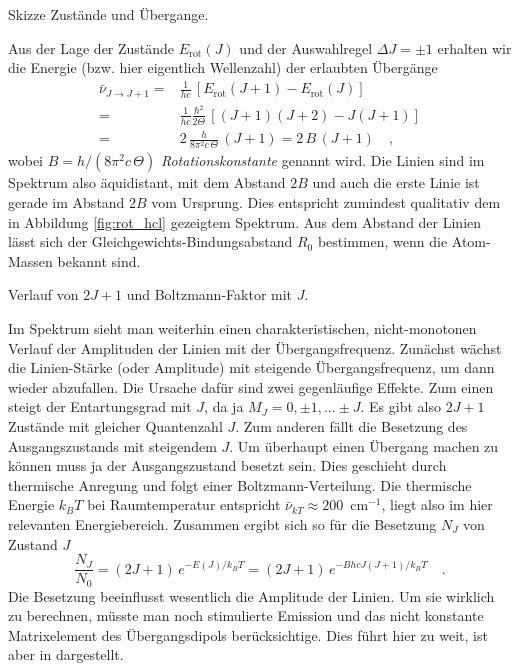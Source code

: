 \begin{marginfigure}
\caption{Skizze Zustände und Übergange.}
\end{marginfigure}


Aus der Lage der Zustände $E_\text{rot}(J)$ und der Auswahlregel $\Delta J = \pm 1$ erhalten wir die  Energie (bzw. hier eigentlich Wellenzahl) der erlaubten Übergänge
\begin{align}
 \bar{\nu}_{J \rightarrow J + 1} =& \frac{1}{h c}  \, \left[ E_\text{rot}(J+1) - E_\text{rot}(J) \right]
 \\ 
 =  & \frac{1}{h c}\frac{\hbar^2}{2 \Theta} \, \left[ (J+1)(J+2) - J (J+1) \right] \\
 = & 2 \, \frac{h}{8 \pi^2 c \, \Theta} \, \left( J +1 \right) = 2 \, B \, (J+1) \quad ,
\end{align}
wobei $B = h / (8 \pi^2 c \, \Theta)$ \emph{Rotationskonstante} genannt wird. Die Linien sind im Spektrum also äquidistant, mit dem Abstand $2B$ und auch die erste Linie ist gerade im Abstand $2B$ vom Ursprung. Dies entspricht zumindest qualitativ dem in Abbildung \ref{fig:rot_hcl} gezeigtem Spektrum. Aus dem Abstand der Linien lässt sich der Gleichgewichts-Bindungsabstand $R_0$ bestimmen, wenn die Atom-Massen bekannt sind.



\begin{marginfigure}
\caption{Verlauf von $2J +1$ und Boltzmann-Faktor mit $J$.}
\end{marginfigure}


Im Spektrum sieht man weiterhin einen charakteristischen, nicht-monotonen Verlauf der Amplituden der Linien mit der Übergangsfrequenz. Zunächst wächst die Linien-Stärke (oder Amplitude) mit steigende Übergangsfrequenz, um dann wieder abzufallen. Die Ursache dafür sind zwei gegenläufige Effekte. Zum einen steigt der Entartungsgrad mit $J$, da ja $M_J = 0, \pm 1, ... \pm J$. Es gibt also $2J+1$ Zustände mit gleicher Quantenzahl $J$.
Zum anderen fällt die Besetzung des Ausgangszustands mit steigendem $J$. Um überhaupt einen Übergang machen zu können muss ja der Ausgangszustand besetzt sein. Dies geschieht durch thermische Anregung und folgt einer Boltzmann-Verteilung. Die thermische Energie $k_B T$ bei Raumtemperatur entspricht  $\bar{\nu}_{k T} \approx 200$~cm$^{-1}$, liegt also im hier relevanten Energiebereich. Zusammen ergibt sich so für die Besetzung $N_J$ von Zustand $J$
\begin{equation}
 \frac{N_J}{N_0}= (2J+1) \, e^{- E(J) / k_B T} = (2J+1) \, e^{- B hc J (J+1) / k_B T}  \quad .
\end{equation}
Die Besetzung beeinflusst wesentlich die Amplitude der Linien. Um sie wirklich zu berechnen, müsste man noch stimulierte Emission und das nicht konstante Matrixelement des Übergangsdipols berücksichtige. Dies führt hier zu weit, ist aber in \cite{Demtröder_molekuelphysik} dargestellt.





